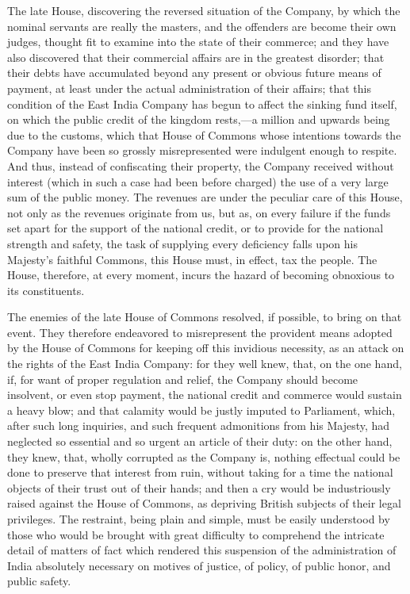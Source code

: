The late House, discovering the reversed situation of the Company, by which the nominal servants are really the masters, and the offenders are become their own judges, thought fit to examine into the state of their commerce; and they have also discovered that their commercial affairs are in the greatest disorder; that their debts have accumulated beyond any present or obvious future means of payment, at least under the actual administration of their affairs; that this condition of the East India Company has begun to affect the sinking fund itself, on which the public credit of the kingdom rests,—a million and upwards being due to the customs, which that House of Commons whose intentions towards the Company have been so grossly misrepresented were indulgent enough to respite. And thus, instead of confiscating their property, the Company received without interest (which in such a case had been before charged) the use of a very large sum of the public money. The revenues are under the peculiar care of this House, not only as the revenues originate from us, but as, on every failure if the funds set apart for the support of the national credit, or to provide for the national strength and safety, the task of supplying every deficiency falls upon his Majesty's faithful Commons, this House must, in effect, tax the people. The House, therefore, at every moment, incurs the hazard of becoming obnoxious to its constituents.

The enemies of the late House of Commons resolved, if possible, to bring on that event. They therefore endeavored to misrepresent the provident means adopted by the House of Commons for keeping off this invidious necessity, as an attack on the rights of the East India Company: for they well knew, that, on the one hand, if, for want of proper regulation and relief, the Company should become insolvent, or even stop payment, the national credit and commerce would sustain a heavy blow; and that calamity would be justly imputed to Parliament, which, after such long inquiries, and such frequent admonitions from his Majesty, had neglected so essential and so urgent an article of their duty: on the other hand, they knew, that, wholly corrupted as the Company is, nothing effectual could be done to preserve that interest from ruin, without taking for a time the national objects of their trust out of their hands; and then a cry would be industriously raised against the House of Commons, as depriving British subjects of their legal privileges. The restraint, being plain and simple, must be easily understood by those who would be brought with great difficulty to comprehend the intricate detail of matters of fact which rendered this suspension of the administration of India absolutely necessary on motives of justice, of policy, of public honor, and public safety.

